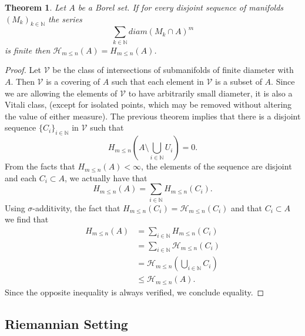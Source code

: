 \documentclass[%
 aip,
 amsmath,amssymb,
 reprint,%
jmp]{revtex4-2}
\newtheorem{theorem}{Theorem}[section]
\begin{document}
\begin{theorem}
Let $A$ be a Borel set. If for every disjoint sequence of manifolds $(M_{k})_{k\in\mathbb{N}}$ the series
\begin{equation*}
    \sum_{k\in\mathbb{N}}diam(M_{k}\cap A)^{m}
\end{equation*}
is finite then $\mathcal{H}_{m\leq n}(A) = H_{m\leq n}(A)$.
\end{theorem}
\begin{proof}
Let $\mathcal{V}$ be the class of intersections of submanifolds of finite diameter with $A$. Then $\mathcal{V}$ is a covering of $A$ such that each element in $\mathcal{V}$ is a subset of $A$. Since we are allowing the elements of $\mathcal{V}$ to have arbitrarily small diameter, it is also a Vitali class, (except for isolated points, which may be removed without altering the value of either measure). The previous theorem implies that there is a disjoint sequence $\{C_{i}\}_{i\in\mathbb{N}}$ in $\mathcal{V}$ such that
\begin{equation*}
    H_{m\leq n}\left(A\setminus\bigcup_{i\in\mathbb{N}}U_{i}\right) = 0.
\end{equation*}
From the facts that $H_{m\leq n}(A) < \infty$, the elements of the sequence are disjoint and each $C_{i}\subset A$, we actually have that
\begin{equation*}
    H_{m\leq n}(A) = \sum_{i\in\mathbb{N}}H_{m\leq n}\left(C_{i}\right).
\end{equation*}
Using $\sigma$-additivity, the fact that $H_{m\leq n}(C_{i}) = \mathcal{H}_{m\leq n}(C_{i})$ and that $C_{i}\subset A$ we find that
\begin{align*}
    H_{m\leq n}(A) &= \sum_{i\in\mathbb{N}}H_{m\leq n}(C_{i})\\
    &= \sum_{i\in\mathbb{N}}\mathcal{H}_{m\leq n}(C_{i})\\
    &= \mathcal{H}_{m\leq n}\left(\bigcup_{i\in\mathbb{N}}C_{i}\right)\\
    &\leq \mathcal{H}_{m\leq n}(A).
\end{align*}
Since the opposite inequality is always verified, we conclude equality.
\end{proof}

\subsection{Riemannian Setting}\label{SecRiemannian}
\end{document}

